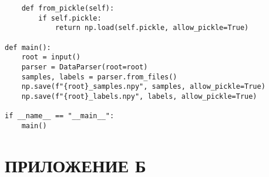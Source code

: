 \begin{footnotesize}
\begin{lstlisting}
    def from_pickle(self):
        if self.pickle:
            return np.load(self.pickle, allow_pickle=True)

def main():
    root = input()
    parser = DataParser(root=root)
    samples, labels = parser.from_files()
    np.save(f"{root}_samples.npy", samples, allow_pickle=True)
    np.save(f"{root}_labels.npy", labels, allow_pickle=True)

if __name__ == "__main__":
    main()

\end{lstlisting}
\end{footnotesize}

\chapter*{ПРИЛОЖЕНИЕ Б}
